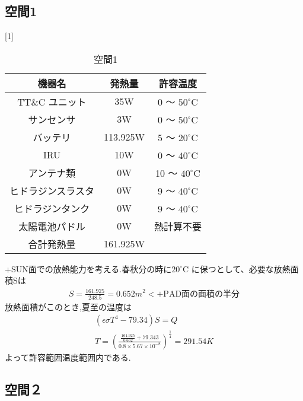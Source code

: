 \documentclass[15pt,uplatex,dvipdfmx]{jsarticle}
\begin{document}
\subsection{空間1}
\begin{table}[H]
  \begin{center}
  \caption{空間1}
  \scalebox{1}[1]{
  \begin{tabular}{|c|c|c|} \hline
    機器名 &  発熱量 & 許容温度 \\ \hline
  TT\&C ユニット
  & 35W
  & 0 〜 ${50}^\circ\mathrm{C}$\\

  サンセンサ
  & 3W
  & 0 〜 ${50}^\circ\mathrm{C}$\\

  バッテリ
  & 113.925W
  & 5 〜 ${20}^\circ\mathrm{C}$\\

  IRU
  & 10W
  & 0 〜 ${40}^\circ\mathrm{C}$\\

  アンテナ類
  & 0W
  & 10 〜 ${40}^\circ\mathrm{C}$\\

  ヒドラジンスラスタ
  & 0W
  & 9 〜 ${40}^\circ\mathrm{C}$\\

  ヒドラジンタンク
  & 0W
  & 9 〜 ${40}^\circ\mathrm{C}$\\

  太陽電池パドル
  & 0W
  &  熱計算不要\\ \hline

  合計発熱量
  & 161.925W
  & \\\hline
  \end{tabular}
  }
\end{center}
\end{table}

+SUN面での放熱能力を考える.春秋分の時に${20}^\circ\mathrm{C}$
に保つとして、必要な放熱面積Sは
\begin{eqnarray}
  S=\frac{161.925}{248.5}=0.652m^2<\text{+PAD面の面積の半分}
\end{eqnarray}
放熱面積がこのとき,夏至の温度は
\begin{eqnarray}
  (\epsilon\sigma T^4 -79.34)S=Q\\
  T =(\frac{\frac{161.925}{0.652}+79.343}
  {0.8\times5.67\times10^{-8}})^{\frac{1}{4}}=291.54K
\end{eqnarray}
よって許容範囲温度範囲内である.

\subsection{空間２}
\end{document}
